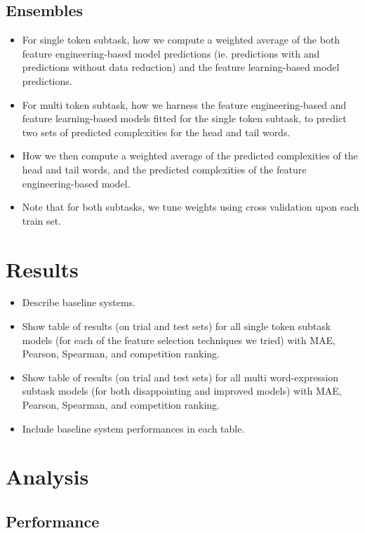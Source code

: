 \documentclass[11pt,a4paper]{article}
\begin{document}
\subsection{Ensembles}
\begin{itemize}
  \item For single token subtask, how we compute a weighted average of the both feature engineering-based model predictions (ie. predictions with and predictions without data reduction) and the feature learning-based model predictions.
  \item For multi token subtask, how we harness the feature engineering-based and feature learning-based models fitted for the single token subtask, to predict two sets of predicted complexities for the head and tail words.
  \item How we then compute a weighted average of the predicted complexities of the head and tail words, and the predicted complexities of the feature engineering-based model.
  \item Note that for both subtasks, we tune weights using cross validation upon each train set.
\end{itemize}

\section{Results}

\begin{itemize}
  \item Describe baseline systems.
  \item Show table of results (on trial and test sets) for all single token subtask models (for each of the feature selection techniques we tried) with MAE, Pearson, Spearman, and competition ranking.
  \item Show table of results (on trial and test sets) for all multi word-expression subtask models (for both disappointing and improved models) with MAE, Pearson, Spearman, and competition ranking.
  \item Include baseline system performances in each table.
\end{itemize}

\section{Analysis}

\subsection{Performance}
\end{document}
